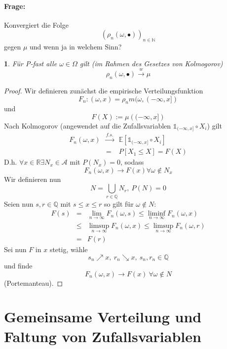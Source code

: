 \documentclass[10pt,a4paper]{report}
\numberwithin{equation}{section}
\numberwithin{figure}{section}
\theoremstyle{plain}
\theoremstyle{definition}
\theoremstyle{remark}
\theoremstyle{plain}
\newtheorem{prop}[thm]{\protect\propositionname}
\providecommand{\propositionname}{Satz}
\newcommand{\1}{ \mathbb{1} } %
\begin{document}
\paragraph*{Frage:}

Konvergiert die Folge 
\[
\left(\rho_{n}\left(\omega,\bullet\right)\right)_{n\in\mathbb{N}}
\]
gegen $\mu$ und wenn ja in welchem Sinn?
\begin{prop}  %
  Für P-fast alle $\omega\in\Omega$ gilt (im Rahmen des Gesetzes von
  Kolmogorov)
  \[
  \rho_{n}\left(\omega,\bullet\right)\overset{w}{\longrightarrow}\mu
  \]
\end{prop}
\begin{proof}
  Wir definieren zunächst die empirische Verteilungsfunktion
  \[
  F_{n}:\left(\omega,x\right)=\rho_{n}m(\omega,(-\infty,x])
  \]
  und 
  \[
  F\left(X\right):=\mu\left((-\infty,x]\right)
  \]
  Nach Kolmogorov (angewendet auf die Zufallsvariablen $\1_{(-\infty,x]}\circ X_{i}$)
  gilt 
  \begin{eqnarray*}
    F_{n}\left(\omega,x\right) & \overset{f.s.}{\longrightarrow} & \mathbb{E}\left[\1_{(-\infty,x]}\circ X_{i}\right]\\
    & = & P\left[X_{1}\leq X\right]=F\left(X\right)
  \end{eqnarray*}
  D.h. $\forall x\in\mathbb{R}\exists N_{x}\in\mathcal{A}$ mit $P\left(N_{x}\right)=0$,
  sodass 
  \[
  F_{n}\left(\omega,x\right)\to F\left(x\right)\forall\omega\notin N_{x}
  \]
  Wir definieren nun 
  \[
  N=\bigcup_{r\in\mathbb{Q}}N_{r},\ P\left(N\right)=0
  \]
  Seien nun $s,r\in\mathbb{Q}$ mit $s\leq x\leq r$ so gilt für $\omega\notin N$:
  \begin{eqnarray*}
    F\left(s\right) & = & \lim_{n\to\infty}F_{n}\left(\omega,s\right)\leq\liminf_{n\to\infty}F_{n}\left(\omega,x\right)\\
    & \leq & \limsup_{n\to\infty}F_{n}\left(\omega,x\right)\leq\limsup_{n\to\infty}F_{n}\left(\omega,r\right)\\
    & = & F\left(r\right)
  \end{eqnarray*}
  Sei nun $F$ in $x$ stetig, wähle 
  \[
  s_{n}\nearrow x,\ r_{n}\searrow x,\ s_{n},r_{n}\in\mathbb{Q}
  \]
  und finde 
  \[
  F_{n}\left(\omega,x\right)\to F\left(x\right)\ \forall\omega\notin N
  \]
  (Portemanteau). 
\end{proof}

\section{Gemeinsame Verteilung und Faltung von Zufallsvariablen}
\end{document}
